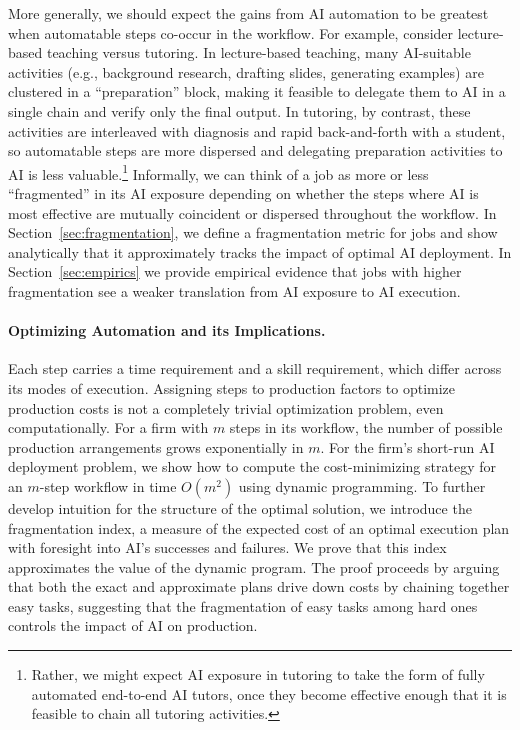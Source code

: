 More generally, we should expect the gains from AI automation to be greatest when automatable steps co-occur in the workflow.
For example, consider lecture-based teaching versus tutoring.
In lecture-based teaching, many AI-suitable activities (e.g., background research, drafting slides, generating examples) are clustered in a ``preparation'' block, making it feasible to delegate them to AI in a single chain and verify only the final output.
In tutoring, by contrast, these activities are interleaved with diagnosis and rapid back-and-forth with a student, so automatable steps are more dispersed and delegating preparation activities to AI is less valuable.\footnote{Rather, we might expect AI exposure in tutoring to take the form of fully automated end-to-end AI tutors, once they become effective enough that it is feasible to chain all tutoring activities.} 
Informally, we can think of a job as more or less ``fragmented'' in its AI exposure depending on whether the steps where AI is most effective are mutually coincident or dispersed throughout the workflow.
In Section~\ref{sec:fragmentation}, we define a fragmentation metric for jobs and show analytically that it approximately tracks the impact of optimal AI deployment.
In Section~\ref{sec:empirics} we provide empirical evidence that jobs with higher fragmentation see a weaker translation from AI exposure to AI execution.

\paragraph{Optimizing Automation and its Implications.}
Each step carries a time requirement and a skill requirement, which differ across its modes of execution.
Assigning steps to production factors to optimize production costs is not a completely trivial optimization problem, even computationally. 
For a firm with $m$ steps in its workflow, the number of possible production arrangements grows exponentially in $m$. 
For the firm's short-run AI deployment problem, we show how to compute the cost-minimizing strategy for an $m$-step workflow in time $O(m^2)$ using dynamic programming.  To further develop intuition for the structure of the optimal solution, we introduce the fragmentation index, a measure of the expected cost of an optimal execution plan with foresight into AI's successes and failures.  We prove that this index approximates the value of the dynamic program.  The proof proceeds by arguing that both the exact and approximate plans drive down costs by chaining together easy tasks, suggesting that the fragmentation of easy tasks among hard ones controls the impact of AI on production.

